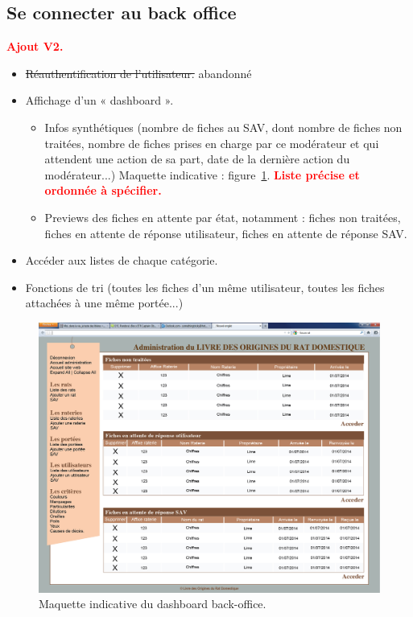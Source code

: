 ﻿\documentclass[a4paper,10pt]{article}
\newcommand\desire[1]{\noindent\textbf{\textcolor{red}{#1}}}
\begin{document}
\subsection{Se connecter au back office}
\desire{Ajout V2.} 
\begin{itemize}
\item \sout{Réauthentification de l'utilisateur.} abandonné 
\item Affichage d'un « dashboard ».
\begin{itemize}
\item Infos synthétiques (nombre de fiches au SAV, dont nombre de fiches non traitées, nombre de fiches prises en charge par ce modérateur et qui attendent une action de sa part, date de la dernière action du modérateur...) Maquette indicative : figure~\ref{fig:kerdashback}. \desire{Liste précise et ordonnée à spécifier.}
\item Previews des fiches en attente par état, notamment : fiches non traitées, fiches en attente de réponse utilisateur, fiches en attente de réponse SAV.
\end{itemize}
\item Accéder aux listes de chaque catégorie.
\item Fonctions de tri (toutes les fiches d'un même utilisateur, toutes les fiches attachées à une même portée...)
\end{itemize}

\begin{figure}[htbp]%
\begin{center}\includegraphics[width=0.8\linewidth]{MaquetteSAV.jpg}\end{center}
\caption{Maquette indicative du dashboard back-office.\label{fig:kerdashback}}
\end{figure}
\end{document}
